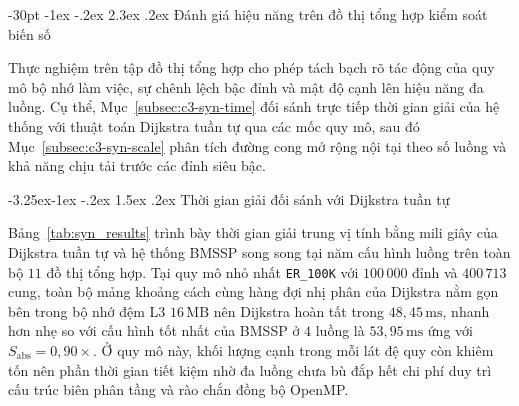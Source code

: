 \documentclass[12pt,a4paper,openany,oneside]{report}
\makeatletter
\theoremstyle{plain}
\renewcommand\section{\@startsection {section}{1}{\z@}
    {-30pt \@plus -1ex \@minus -.2ex}
    {2.3ex \@plus.2ex}
    {\normalfont\large\bfseries}}
\renewcommand\subsection{\@startsection{subsection}{2}{\z@}
    {-3.25ex\@plus -1ex \@minus -.2ex}
    {1.5ex \@plus .2ex}
    {\normalfont\normalsize\bfseries}}
\numberwithin{equation}{section}
\makeatother
\begin{document}
\section{Đánh giá hiệu năng trên đồ thị tổng hợp kiểm soát biến số}\label{sec:c3-synthetic}

Thực nghiệm trên tập đồ thị tổng hợp cho phép tách bạch rõ tác động của quy mô bộ nhớ làm việc, sự chênh lệch bậc đỉnh và mật độ cạnh lên hiệu năng đa luồng. Cụ thể, Mục~\ref{subsec:c3-syn-time} đối sánh trực tiếp thời gian giải của hệ thống với thuật toán Dijkstra tuần tự qua các mốc quy mô, sau đó Mục~\ref{subsec:c3-syn-scale} phân tích đường cong mở rộng nội tại theo số luồng và khả năng chịu tải trước các đỉnh siêu bậc.

\subsection{Thời gian giải đối sánh với Dijkstra tuần tự}\label{subsec:c3-syn-time}

Bảng~\ref{tab:syn_results} trình bày thời gian giải trung vị tính bằng mili giây của Dijkstra tuần tự và hệ thống BMSSP song song tại năm cấu hình luồng trên toàn bộ $11$ đồ thị tổng hợp. Tại quy mô nhỏ nhất \texttt{ER\_100K} với $100\,000$ đỉnh và $400\,713$ cung, toàn bộ mảng khoảng cách cùng hàng đợi nhị phân của Dijkstra nằm gọn bên trong bộ nhớ đệm L3 $16\,\mathrm{MB}$ nên Dijkstra hoàn tất trong $48{,}45\,\mathrm{ms}$, nhanh hơn nhẹ so với cấu hình tốt nhất của BMSSP ở $4$ luồng là $53{,}95\,\mathrm{ms}$ ứng với $S_{\mathrm{abs}} = 0{,}90\times$. Ở quy mô này, khối lượng cạnh trong mỗi lát đệ quy còn khiêm tốn nên phần thời gian tiết kiệm nhờ đa luồng chưa bù đắp hết chi phí duy trì cấu trúc biên phân tầng và rào chắn đồng bộ OpenMP.
\end{document}
